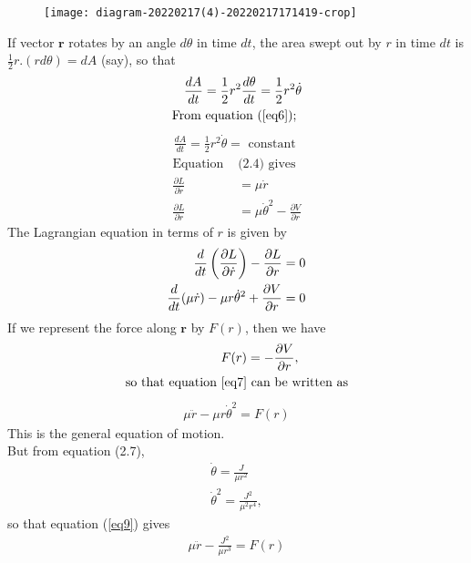 \begin{figure}[H]
	\centering
	\texttt{[image: diagram-20220217(4)-20220217171419-crop]}
	\caption{}
	\label{}
\end{figure}
If vector $\mathbf{r}$ rotates by an angle $d \theta$ in time $d t$, the area swept out by $r$ in time $d t$ is $\frac{1}{2} r .(r d \theta)=d A$ (say), so that
\begin{align*}
\frac{d A}{d t}=\frac{1}{2} r^{2} \frac{d \theta}{d t}&=\frac{1}{2} r^{2} \dot{\theta}\\
\text{From equation }&(\ref*{eq6});
\end{align*}
\begin{align}
\frac{d A}{d t}=\frac{1}{2} r^{2} \dot{\theta}=\text { constant }
\end{align}
\begin{align*}
\text{Equation }&\text{(2.4) gives }\\
\frac{\partial L}{\partial \dot{r}}&=\mu \dot{r}\\
\frac{\partial L}{\partial r}&=\mu \dot{\theta}^{2}-\frac{\partial V}{\partial r} 
\end{align*}
The Lagrangian equation in terms of $r$ is given by
\begin{align}
\frac{d}{d t}\left(\frac{\partial L}{\partial \dot{r}}\right)-\frac{\partial L}{\partial r}=0 \notag\\
\frac{d}{d t}(\mu \dot{r})-\mu r \dot{\theta}^{2}+\frac{\partial V}{\partial r}=0\label{eq7}
\end{align}
If we represent the force along $\mathbf{r}$ by $F(r)$, then we have
\begin{align*}
F(r)&=-\frac{\partial V}{\partial r},\\
\text{so that equation \ref{eq7}}&\text{ can be written as}
\end{align*}
\begin{align}
\mu \ddot{r}-\mu r \dot{\theta}^{2}=F(r) \label{eq9}
\end{align}
This is the general equation of motion.\\
 But from equation (2.7),
 \begin{align*}
  \dot{\theta}=\frac{J}{\mu r^{2}}\\
 \dot{\theta}^{2}=\frac{J^{2}}{\mu^{2} r^{4}},
 \end{align*}
so that equation (\ref{eq9}) gives
\begin{align}
\mu \ddot{r}-\frac{J^{2}}{\mu r^{3}}=F(r) \label{eq10}
\end{align}
